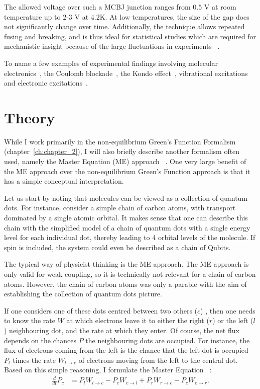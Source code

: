 The allowed voltage over such a MCBJ junction ranges from $0.5$ V at room temperature up to $2$-$3$ V at $4.2$K. At low temperatures, the size of the gap does not significantly change over time. Additionally, the technique allows repeated fusing and breaking, and is thus ideal for statistical studies which are required for mechanistic insight because of the large fluctuations in experiments ~\cite{ratnerrev2013}.

To name a few examples of experimental findings involving molecular electronics~\cite{koole}, the Coulomb blockade~\cite{Park2000, Park2002}, the Kondo effect~\cite{Park2002}, vibrational excitations~\cite{vib1, vib2} and electronic excitations~\cite{elec1}.

\section{Theory}
\label{sec:theoryintro}
While I work primarily in the non-equilibrium Green's Function Formalism (chapter~\ref{ch:chapter_2}),  I will also briefly describe another formalism often used, namely the Master Equation (ME) approach ~\cite{seldenthuis}. One very large benefit of the ME approach over the non-equilibrium Green's Function approach is that it has a simple conceptual interpretation.

Let us start by noting that molecules can be viewed as a collection of quantum dots. For instance, consider a simple chain of carbon atoms, with transport dominated by a single atomic orbital. It makes sense that one can describe this chain with the simplified model of a chain of quantum dots with a single energy level for each individual dot, thereby leading to 4 orbital levels of the molecule. If spin is included, the system could even be described as a chain of Qubits.

The typical way of physicist thinking is the ME approach. The ME approach is only valid for weak coupling, so it is technically not relevant for a chain of carbon atoms. However, the chain of carbon atoms was only a parable with the aim of establishing the collection of quantum dots picture.

If one considers one of these dots centred between two others ($c$) , then one needs to know the rate $W$ at which electrons leave it to either the right ($r$) or the left ($l$) neighbouring dot, and the rate at which they enter. Of course, the net flux depends on the chances $P$ the neighbouring dots are occupied. For instance, the flux of electrons coming from the left is the chance that the left dot is occupied $P_l$ times the rate $W_{l\rightarrow c}$ of electrons moving from the left to the central dot. Based on this simple reasoning, I formulate the Master Equation ~\cite{beenakker}:
\begin{align*}
\frac{d}{dt} P_c &= P_l W_{l\rightarrow c} - P_c W_{c\rightarrow l} + P_r  W_{r\rightarrow c} - P_c W_{c\rightarrow r}.
\end{align*}

